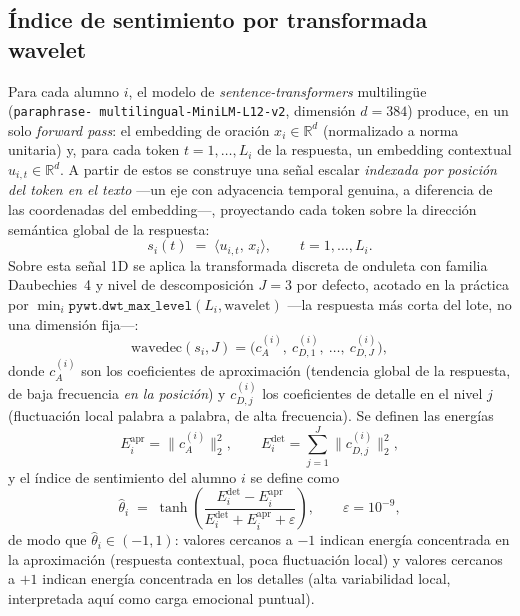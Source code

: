 \documentclass[11pt,a4paper,oneside]{article}
\theoremstyle{definition}
\begin{document}
\subsection{Índice de sentimiento por transformada wavelet}
\label{sec:indice}

Para cada alumno $i$, el modelo de \emph{sentence-transformers} multilingüe (\texttt{paraphrase-
multilingual-MiniLM-L12-v2}, dimensión $d=384$) \cite{ReimersGurevych2019} produce, en un solo
\emph{forward pass}: el embedding de oración $x_i\in\mathbb{R}^d$ (normalizado a norma unitaria)
y, para cada token $t=1,\ldots,L_i$ de la respuesta, un embedding contextual
$u_{i,t}\in\mathbb{R}^d$. A partir de estos se construye una señal escalar \emph{indexada por
posición del token en el texto} —un eje con adyacencia temporal genuina, a diferencia de las
coordenadas del embedding—, proyectando cada token sobre la dirección semántica global de la
respuesta:
\[
s_i(t) \;=\; \langle u_{i,t},\, x_i\rangle, \qquad t=1,\ldots,L_i.
\]
Sobre esta señal 1D se aplica la transformada discreta de onduleta \cite{Mallat1989} con familia
Daubechies~4 y nivel de descomposición $J=3$ por defecto, acotado en la práctica por
$\min_i \texttt{pywt.dwt\_max\_level}(L_i,\text{wavelet})$ —la respuesta más corta del lote,
no una dimensión fija—:
\[
\mathrm{wavedec}(s_i, J) = \big(c^{(i)}_A,\ c^{(i)}_{D,1},\ \ldots,\ c^{(i)}_{D,J}\big),
\]
donde $c^{(i)}_A$ son los coeficientes de aproximación (tendencia global de la respuesta, de
baja frecuencia \emph{en la posición}) y $c^{(i)}_{D,j}$ los coeficientes de detalle en el nivel
$j$ (fluctuación local palabra a palabra, de alta frecuencia). Se definen las energías
\[
E^{\mathrm{apr}}_i = \big\lVert c^{(i)}_A \big\rVert_2^2,
\qquad
E^{\mathrm{det}}_i = \sum_{j=1}^{J} \big\lVert c^{(i)}_{D,j} \big\rVert_2^2 ,
\]
y el índice de sentimiento del alumno $i$ se define como
\[
\hat\theta_i \;=\; \tanh\!\left(\frac{E^{\mathrm{det}}_i - E^{\mathrm{apr}}_i}
{E^{\mathrm{det}}_i + E^{\mathrm{apr}}_i + \varepsilon}\right), \qquad \varepsilon = 10^{-9},
\]
de modo que $\hat\theta_i\in(-1,1)$: valores cercanos a $-1$ indican energía concentrada en la
aproximación (respuesta contextual, poca fluctuación local) y valores cercanos a $+1$ indican
energía concentrada en los detalles (alta variabilidad local, interpretada aquí como carga
emocional puntual).
\end{document}
